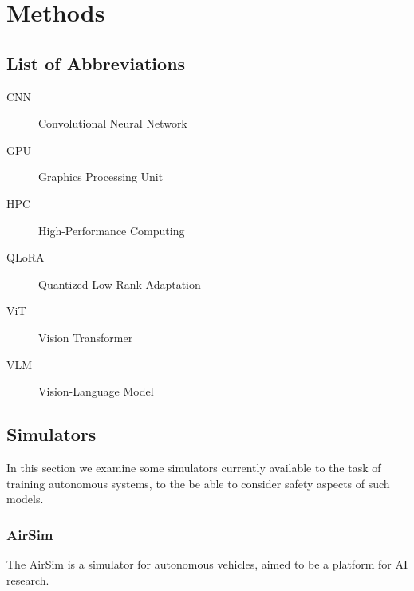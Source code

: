 

\chapter{Methods}
\label{Methods} 

\section*{List of Abbreviations}
\label{sec:abbreviations}

\begin{description}
    \item[CNN] Convolutional Neural Network
    \item[GPU] Graphics Processing Unit
    \item[HPC] High-Performance Computing
    \item[QLoRA] Quantized Low-Rank Adaptation
    \item[ViT] Vision Transformer
    \item[VLM] Vision-Language Model
\end{description}

\section{Simulators}

In this section we examine some simulators currently available to the task of training autonomous systems, to the be able to consider safety aspects of such models.

\subsection{AirSim}

The AirSim \cite{airsim2017fsr} is a simulator for autonomous vehicles, aimed to be a platform for AI research.

